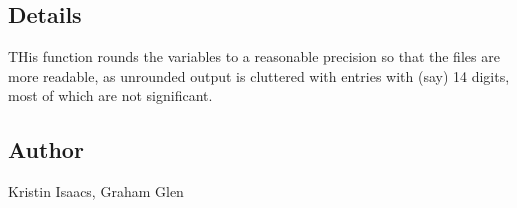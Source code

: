 \documentclass[
]{article}
\begin{document}
\hypertarget{details-34}{%
\subsection{Details}\label{details-34}}

THis function rounds the variables to a reasonable precision so that the
files are more readable, as unrounded output is cluttered with entries
with (say) 14 digits, most of which are not significant.

\hypertarget{author-37}{%
\subsection{Author}\label{author-37}}

Kristin Isaacs, Graham Glen
\end{document}
